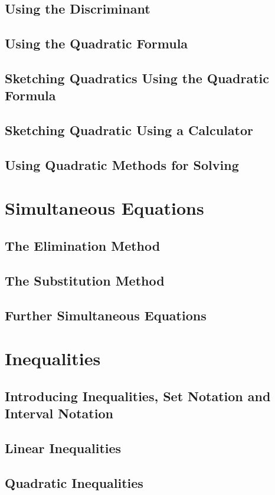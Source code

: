 \documentclass[../maths.tex]{subfiles}
\begin{document}
\subsection*{Using the Discriminant}
\subsection*{Using the Quadratic Formula}
\subsection*{Sketching Quadratics Using the Quadratic Formula}
\subsection*{Sketching Quadratic Using a Calculator}
\subsection*{Using Quadratic Methods for Solving}
\section{Simultaneous Equations}
\subsection*{The Elimination Method}
\subsection*{The Substitution Method}
\subsection*{Further Simultaneous Equations}
\section{Inequalities}
\subsection*{Introducing Inequalities, Set Notation and Interval Notation}
\subsection*{Linear Inequalities}
\subsection*{Quadratic Inequalities}
\end{document}
